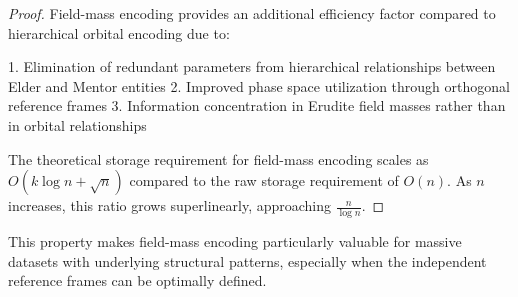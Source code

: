 \begin{proof}
Field-mass encoding provides an additional efficiency factor compared to hierarchical orbital encoding due to:

1. Elimination of redundant parameters from hierarchical relationships between Elder and Mentor entities
2. Improved phase space utilization through orthogonal reference frames
3. Information concentration in Erudite field masses rather than in orbital relationships

The theoretical storage requirement for field-mass encoding scales as $O(k \log n + \sqrt{n})$ compared to the raw storage requirement of $O(n)$. As $n$ increases, this ratio grows superlinearly, approaching $\frac{n}{\log n}$.
\end{proof}

This property makes field-mass encoding particularly valuable for massive datasets with underlying structural patterns, especially when the independent reference frames can be optimally defined.

